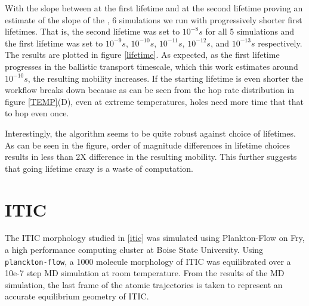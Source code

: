 With the slope between  at the first lifetime and at the second lifetime proving an estimate of the slope
of the , 6 simulations we run with progressively shorter first lifetimes. That is, the second lifetime was
set to $10^{-8}s$ for all 5 simulations and the first lifetime was set to $10^{-9}s$, $10^{-10}s$,
$10^{-11}s$, $10^{-12}s$, and $10^{-13}s$ respectively. The results are plotted in figure
\ref{lifetime}. As expected, as the first lifetime progresses in the ballistic transport timescale, which this work
estimates around $10^{-10}s$, the resulting mobility increases. If the starting lifetime is even shorter the
workflow breaks down because as can be seen from the hop rate distribution in figure \ref{TEMP}(D), even at
extreme temperatures, holes need more time that that to hop even once. 

Interestingly, the algorithm seems to be quite robust against choice of lifetimes. As can be seen in the
figure, order of magnitude differences in lifetime choices results in less than 2X difference in the resulting
mobility. This further suggests that going lifetime crazy is a waste of computation.  

\section{ITIC}
\label{itic}
The ITIC morphology studied in \autoref{itic} was simulated using Plankton-Flow \cite{cmelab} on Fry,         
a high performance computing cluster at Boise State University.  
Using \texttt{planckton-flow}, a 1000
molecule morphology of ITIC was equilibrated over a 10e-7 step MD simulation at room temperature. 
From the results of the MD
simulation, the last frame of the atomic trajectories is taken to represent an accurate equilibrium geometry
of ITIC. 

